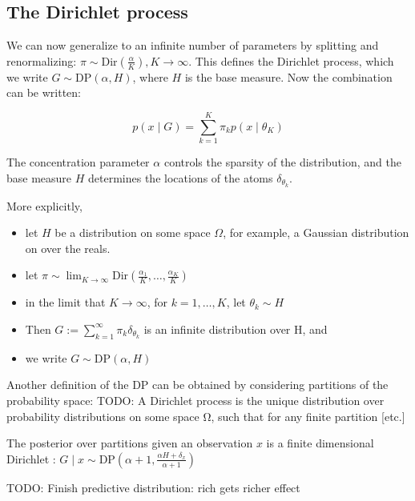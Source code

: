\documentclass[twoside]{article}
\newcommand{\Dir}{\mathrm{Dir}}
\newcommand{\DP}{\mathrm{DP}}
\newcommand{\todo}[1]{{\color{red} TODO: #1}}
\begin{document}
\subsection{The Dirichlet process}
We can now generalize to an infinite number of parameters by splitting and renormalizing: $\pi \sim \Dir(\frac{\alpha}{K}), K \longrightarrow \infty$. This defines the Dirichlet process, which we write $G \sim \DP(\alpha, H)$, where $H$ is the base measure. Now the combination can be written:

$$ p(x \mid G) = \sum_{k=1}^K \pi_k p(x \mid \theta_K) $$

The concentration parameter $\alpha$ controls the sparsity of the distribution, and the base measure $H$ determines the locations of the atoms $\delta_{\theta_k}$.

More explicitly, 
\begin{itemize}
\item let $H$ be a distribution on some space $\Omega$, for example, a Gaussian distribution on over the reals.
\item let $\pi \sim \lim_{K \to \infty} \Dir{\left( \frac{\alpha_1}{K},\ldots,\frac{\alpha_K}{K} \right)}$
\item in the limit that $K \to \infty$, for $k = 1,\ldots,K$, let $\theta_k \sim H$
\item Then $G := \sum_{k=1}^{\infty}\pi_k \delta_{\theta_k}$ is an infinite distribution over H, and
\item we write $G \sim \DP{(\alpha,H)}$
\end{itemize}

Another definition of the DP can be obtained by considering partitions of the probability space: \todo{A Dirichlet process is the unique distribution over probability distributions on some space Ω, such that for any finite partition [etc.]}

The posterior over partitions given an observation $x$ is a finite dimensional Dirichlet :
$ G \mid x \sim \DP(\alpha+1, \frac{\alpha H + \delta_x}{\alpha + 1})$

\todo{Finish predictive distribution: rich gets richer effect}
\end{document}

